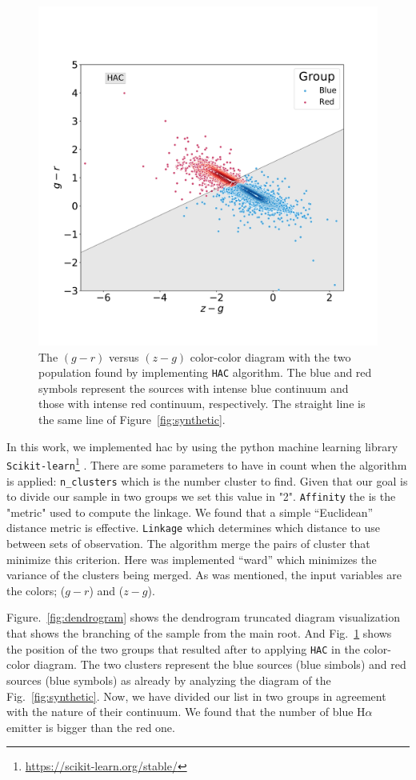 \documentclass[fleqn,usenatbib]{mnras}
\begin{document}
\begin{figure}
	\includegraphics[width=0.9\linewidth]{Figs/blued-red-hierarchical.pdf}
    \caption{The $(g - r)$ versus $(z - g)$ color-color diagram with the two population
    found by implementing \texttt{HAC} algorithm. The blue and red symbols represent the 
    sources with intense blue continuum and those with intense red continuum, respectively. 
    The straight line is the same line of Figure~\ref{fig:synthetic}.}
    \label{fig:hierar}
\end{figure}

In this work, we implemented {\sc hac} by using the python machine learning library
\texttt{Scikit-learn}\footnote{\url{https://scikit-learn.org/stable/}} \citep{Pedregosa:2011}.
There are some parameters to have in count
when the algorithm is applied: \texttt{n\_clusters} which is the number cluster to find. Given
that our goal is to divide our sample in two groups we set this value in "2". \texttt{Affinity}
the is the "metric" used to compute the linkage. We found that a simple ``Euclidean'' distance metric is
effective. \texttt{Linkage} which determines which distance to use between sets of observation.
The algorithm merge the pairs of cluster that minimize this criterion. Here was implemented
``ward'' which minimizes the variance of the clusters being merged. As was mentioned,
the input variables are the colors; ($g - r$) and ($z - g$).

Figure.~\ref{fig:dendrogram} shows the dendrogram truncated diagram visualization that
shows the branching of the sample from the main root. And Fig.~\ref{fig:hierar} shows
the position of the two groups that resulted after to applying \texttt{HAC} in the
color-color diagram. The two clusters represent the blue sources (blue simbols)
and red sources (blue symbols) as already by analyzing the diagram of the
Fig.~\ref{fig:synthetic}. Now, we have divided our list in two groups in agreement
with the nature of their continuum. We found that the number of blue H{$\alpha$}
emitter is bigger than the red one.
\end{document}
